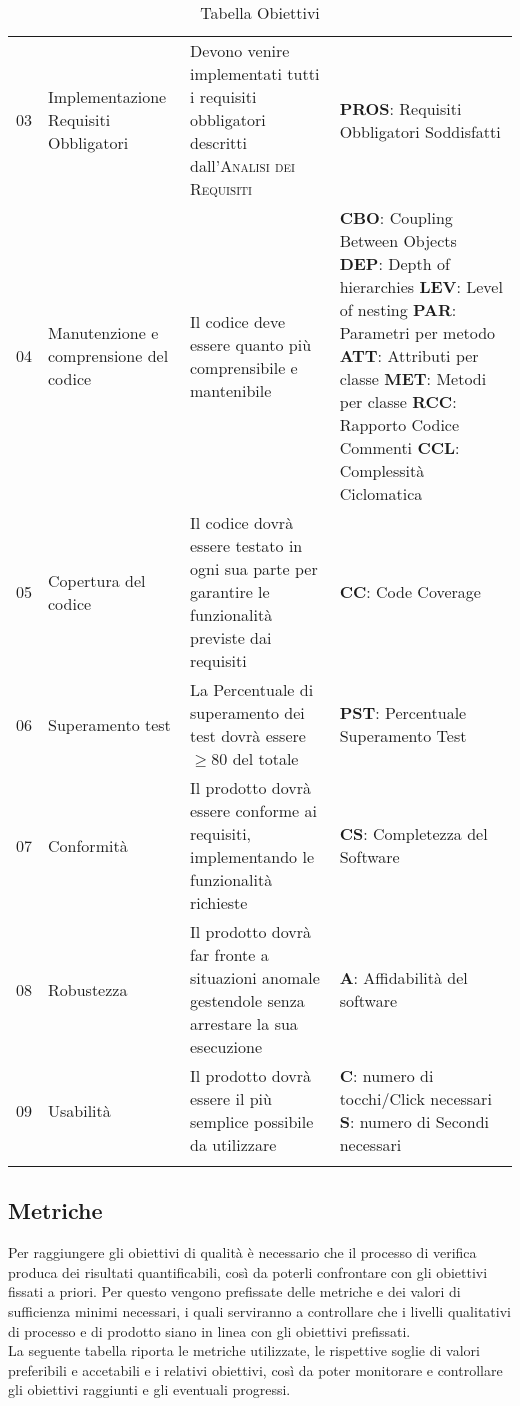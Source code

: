\begin{longtable}{ 
		>{}p{} 
		>{}p{}
        >{}p{}
        >{\centering}p{} }
        03 & Implementazione Requisiti Obbligatori & Devono venire implementati tutti i requisiti obbligatori descritti dall'\textsc{Analisi dei Requisiti} & \textbf{PROS}: Requisiti Obbligatori Soddisfatti \tabularnewline

        04 & Manutenzione e comprensione del codice & Il codice deve essere quanto più comprensibile e mantenibile & \textbf{CBO}: Coupling Between Objects \newline \textbf{DEP}: Depth of hierarchies \newline \textbf{LEV}: Level of nesting \newline \textbf{PAR}: Parametri per metodo \newline \textbf{ATT}: Attributi per classe \newline \textbf{MET}: Metodi per classe \newline\textbf{RCC}: Rapporto Codice Commenti \newline\textbf{{CCL}}: Complessità Ciclomatica \tabularnewline

        05 & Copertura del codice & Il codice dovrà essere testato in ogni sua parte per garantire le funzionalità previste dai requisiti & \textbf{CC}: Code Coverage \tabularnewline

        06 & Superamento test & La Percentuale di superamento dei test dovrà essere $\geq 80$ del totale & \textbf{PST}: Percentuale Superamento Test \tabularnewline

        07 & Conformità & Il prodotto dovrà essere conforme ai requisiti, implementando le funzionalità richieste & \textbf{CS}: Completezza del Software \tabularnewline

        08 & Robustezza & Il prodotto dovrà far fronte a situazioni anomale gestendole senza arrestare la sua esecuzione & \textbf{A}: Affidabilità del software \tabularnewline

        09 & Usabilità & Il prodotto dovrà essere il più semplice possibile da utilizzare & \textbf{C}: numero di tocchi/Click necessari \newline \textbf{S}: numero di Secondi necessari\tabularnewline
        \caption{Tabella Obiettivi}
    \end{longtable}



\subsection{Metriche}
Per raggiungere gli obiettivi di qualità è necessario che il processo di verifica produca dei risultati quantificabili, così da poterli confrontare con gli obiettivi fissati a priori. Per questo vengono prefissate delle metriche e dei valori di sufficienza minimi necessari, i quali serviranno a controllare che i livelli qualitativi di processo e di prodotto siano in linea con gli obiettivi prefissati.\\La seguente tabella riporta le metriche utilizzate, le rispettive soglie di valori preferibili e accetabili e i relativi obiettivi, così da poter monitorare e controllare gli obiettivi raggiunti e gli eventuali progressi.

